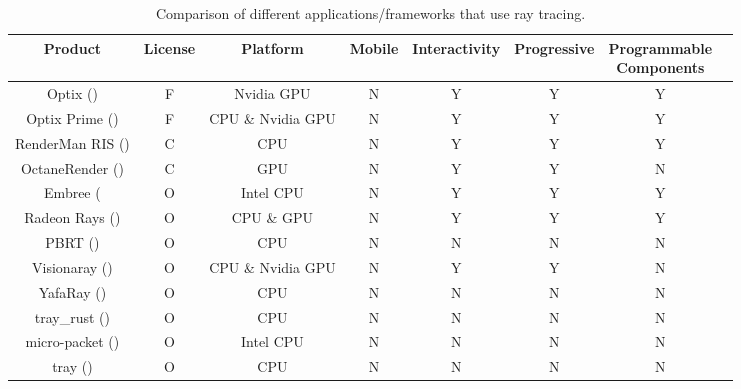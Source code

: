 \begin{table}[H]
\centering
\caption{Comparison of different applications/frameworks that use ray tracing.}
\label{comparison state of the art}
\hspace*{-2.0cm}
\scriptsize
\begin{tabular}{|c|c|c|c|c|c|c|c|}
\hline
\textbf{Product}											& \textbf{License}	& \textbf{Platform}	& \textbf{Mobile}		& \textbf{Interactivity}	& \textbf{Progressive}	& \makecell{\textbf{Programmable} \\ \textbf{Components}}\\ \hline
Optix (\cite{Optix})											& F                	& Nvidia GPU 			& N				& Y                  	& Y                 		& Y\\ \hline
Optix Prime (\cite{OptixPrime})								& F                	& CPU \& Nvidia GPU 	& N				& Y                  	& Y                 		& Y\\ \hline
RenderMan RIS (\cite{RIS})									& C       	& CPU 		             & N                  		& Y                 		& Y				& Y\\ \hline
OctaneRender (\cite{OctaneRender})							& C       	& GPU 		             & N                  		& Y                 		& Y				& N\\ \hline
Embree (\cite{Embree}										& O     	& Intel CPU			& N				& Y                  	& Y                      	& Y\\ \hline
Radeon Rays (\cite{RadeonRays})							& O	& CPU \& GPU		& N				& Y                    	& Y                     	& Y\\ \hline
PBRT (\cite{PBRT})	 									& O	& CPU				& N                 		& N                 		& N				& N\\ \hline
Visionaray (\cite{Visionaray})									& O     	& CPU \& Nvidia GPU	& N                  		& Y				& Y                  	& N\\ \hline
YafaRay	(\cite{YafaRay})									& O     	& CPU 				& N                  		& N				& N                  		& N\\ \hline
tray\_rust (\cite{trayrust})									& O    	& CPU                  	& N                   	& N                  		& N                 		& N\\ \hline
micro-packet (\cite{micro-packet})							& O     	& Intel CPU 			& N                  		& N                  		& N 				& N\\ \hline
tray (\cite{tray})											& O     	& CPU 				& N				& N                     	& N                  		& N\\ \hline

\end{tabular}
\end{table}
